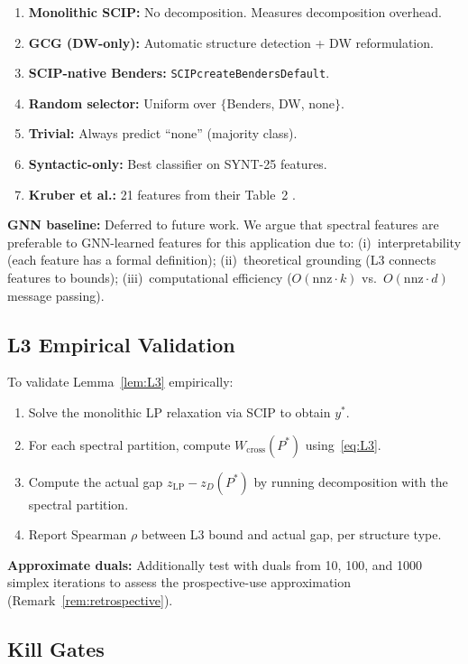 \documentclass[12pt]{article}
\begin{document}
\begin{enumerate}
\item \textbf{Monolithic SCIP:} No decomposition.  Measures decomposition overhead.
\item \textbf{GCG (DW-only):} Automatic structure detection + DW reformulation.
\item \textbf{SCIP-native Benders:} \texttt{SCIPcreateBendersDefault}.
\item \textbf{Random selector:} Uniform over $\{$Benders, DW, none$\}$.
\item \textbf{Trivial:} Always predict ``none'' (majority class).
\item \textbf{Syntactic-only:} Best classifier on SYNT-25 features.
\item \textbf{Kruber et al.:} 21 features from their Table~2 \citep{kruber2017learning}.
\end{enumerate}

\textbf{GNN baseline:} Deferred to future work.  We argue that spectral
features are preferable to GNN-learned features for this application due to:
(i)~interpretability (each feature has a formal definition);
(ii)~theoretical grounding (L3 connects features to bounds);
(iii)~computational efficiency ($O(\mathrm{nnz} \cdot k)$ vs.\
$O(\mathrm{nnz} \cdot d)$ message passing).

\subsection{L3 Empirical Validation}
\label{sec:L3-validation}

To validate Lemma~\ref{lem:L3} empirically:
\begin{enumerate}
\item Solve the monolithic LP relaxation via SCIP to obtain $y^*$.
\item For each spectral partition, compute $W_{\mathrm{cross}}(P^*)$ using~\eqref{eq:L3}.
\item Compute the actual gap $z_{\mathrm{LP}} - z_D(P^*)$ by running
  decomposition with the spectral partition.
\item Report Spearman $\rho$ between L3 bound and actual gap, per structure type.
\end{enumerate}

\textbf{Approximate duals:} Additionally test with duals from 10, 100, and
1000 simplex iterations to assess the prospective-use approximation
(Remark~\ref{rem:retrospective}).

\subsection{Kill Gates}
\label{sec:gates}
\end{document}
